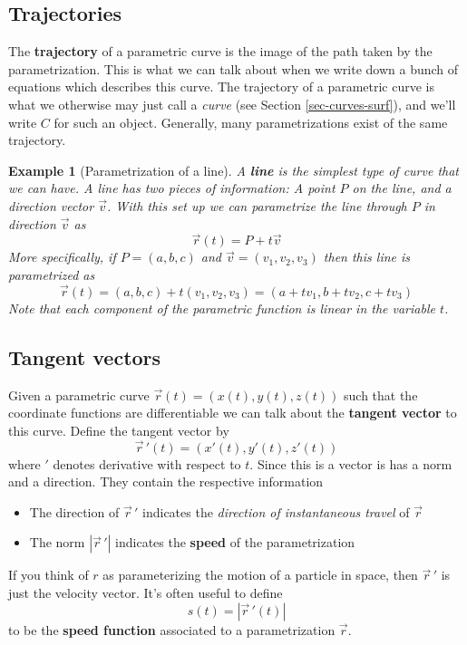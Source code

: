 \documentclass[12pt]{article}
\numberwithin{equation}{subsection}
\numberwithin{figure}{subsection}
\theoremstyle{note}
\newtheorem{example}[subsection]{Example}
\begin{document}
{\subsection{Trajectories}
The \textbf{trajectory} of a parametric curve is the image of the path taken by the parametrization. This is what we can talk about when we write down a bunch of equations which describes this curve. The trajectory of a parametric curve is what we otherwise may just call a \textit{curve} (see Section \ref{sec-curves-surf}), and we'll write $C$ for such an object. Generally, many parametrizations exist of the same trajectory. 


\begin{example}[Parametrization of a line]
A \textbf{line} is the simplest type of curve that we can have. A line has two pieces of information: A point $P$ on the line, and a direction vector $\vec{v}$. With this set up we can parametrize the line through $P$ in direction $\vec{v}$ as \begin{equation} \vec{r}(t)=P+t\vec{v}\end{equation}
More specifically, if $P=(a,b,c)$ and $\vec{v}=(v_1,v_2,v_3)$ then this line is parametrized as \[ \vec{r}(t)=(a,b,c)+t(v_1,v_2,v_3)=(a+tv_1,b+tv_2, c+tv_3)\] 
Note that each component of the parametric function is \textit{linear} in the variable $t$. 
\end{example}

\subsection{Tangent vectors} 

Given a parametric curve $\vec{r}(t)=(x(t),y(t),z(t))$ such that the coordinate functions are differentiable we can talk about the \textbf{tangent vector} to this curve. Define the tangent vector by \begin{equation} \vec{r}\,'(t)=(x'(t),y'(t),z'(t))\end{equation} where $'$ denotes derivative with respect to $t$. Since this is a vector is has a norm and a direction. They contain the respective information \begin{itemize}
	\item The direction of $\vec{r}\,'$ indicates the \textit{direction of instantaneous travel} of $\vec{r}$ 
	\item The norm $|\vec{r}\,'|$ indicates the \textbf{speed} of the parametrization
\end{itemize}
If you think of $r$ as parameterizing the motion of a particle in space, then $\vec{r}\,'$ is just the velocity vector. It's often useful to define \begin{equation} s(t)=|\vec{r}\,'(t)|\end{equation} to be the \textbf{speed function} associated to a parametrization $\vec{r}$.

}
\end{document}

